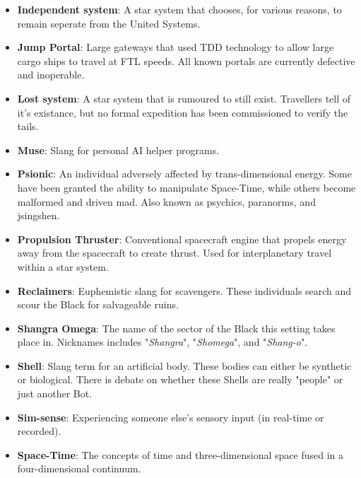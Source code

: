 \documentclass[10pt,twoside]{article}
\begin{document}
\begin{multicols}{2}
\begin{itemize}
    \item \textbf{Independent system}: A star system that chooses, for various reasons, to remain seperate from the United Systems.

    \item \textbf{Jump Portal}: Large gateways that used TDD technology to allow large cargo ships to travel at FTL speeds. All known portals are currently defective and inoperable.

    \item \textbf{Lost system}: A star system that is rumoured to still exist. Travellers tell of it's existance, but no formal expedition has been commissioned to verify the tails.

    \item \textbf{Muse}: Slang for personal AI helper programs.

    \item \textbf{Psionic}: An individual adversely affected by trans-dimensional energy. Some have been granted the ability to manipulate Space-Time, while others become malformed and driven mad. Also known as psychics, paranorms, and jsingshen.

    \item \textbf{Propulsion Thruster}: Conventional spacecraft engine that propels energy away from the spacecraft to create thrust. Used for interplanetary travel within a star system.

    \item \textbf{Reclaimers}: Euphemistic slang for scavengers. These individuals search and scour the Black for salvageable ruins.

    \item \textbf{Shangra Omega}: The name of the sector of the Black this setting takes place in. Nicknames includes "\textit{Shangra}", "\textit{Shomega}", and "\textit{Shang-o}".

    \item \textbf{Shell}: Slang term for an artificial body. These bodies can either be synthetic or biological. There is debate on whether these Shells are really "people" or just another Bot.

    \item \textbf{Sim-sense}: Experiencing someone else's sensory input (in real-time or recorded).

    \item \textbf{Space-Time}: The concepts of time and three-dimensional space fused in a four-dimensional continuum.


\end{itemize}
\end{multicols}
\end{document}
